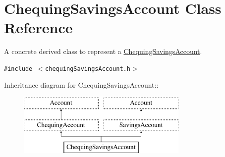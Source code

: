 \hypertarget{classChequingSavingsAccount}{
\section{ChequingSavingsAccount Class Reference}
\label{classChequingSavingsAccount}
}
A concrete derived class to represent a \hyperlink{classChequingSavingsAccount}{ChequingSavingsAccount}.  


{\tt \#include $<$chequingSavingsAccount.h$>$}

Inheritance diagram for ChequingSavingsAccount::\begin{figure}[H]
\begin{center}
\leavevmode
\includegraphics[height=3cm]{classChequingSavingsAccount}
\end{center}
\end{figure}
